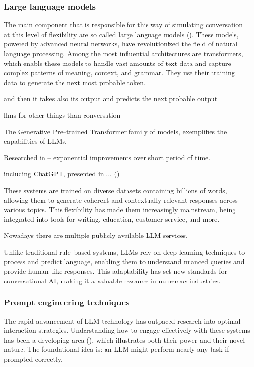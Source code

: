 \documentclass[12pt]{report}
\begin{document}
{\subsubsection{Large language models}

The main component that is responsible for
this way of simulating conversation at this level of flexibility
are so called large language models ().
These models, powered by advanced neural networks,
have revolutionized the field of natural language processing.
Among the most influential architectures are transformers,
which enable these models to handle
vast amounts of text data and capture complex patterns of meaning, context, and grammar.
They use their training data to generate the next most probable token.

and then it takes also its output and predicts the next probable output

llms for other things than conversation

The Generative Pre–trained Transformer family of models,
exemplifies the capabilities of LLMs.

Researched in – exponential improvements over short period of time.

including ChatGPT, presented in ... ()

These systems are trained on diverse datasets containing billions of words,
allowing them to generate coherent and contextually relevant responses across various topics.
This flexibility has made them increasingly mainstream,
being integrated into tools for writing, education, customer service, and more.

Nowadays there are multiple publicly available LLM services.

Unlike traditional rule–based systems,
LLMs rely on deep learning techniques to process and predict language,
enabling them to understand nuanced queries and provide human–like responses.
This adaptability has set new standards for conversational AI,
making it a valuable resource in numerous industries.

\subsubsection{Prompt engineering techniques}

The rapid advancement of LLM technology
has outpaced research into optimal interaction strategies.
Understanding how to engage effectively
with these systems has been a developing area (),
which illustrates both their power and their novel nature.
The foundational idea is:
an LLM might perform nearly any task if prompted correctly.

}
\end{document}
